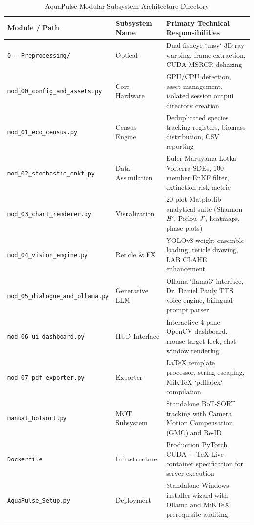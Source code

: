 \documentclass[11pt,a4paper]{article}
\begin{document}
\begin{table}[h!]
\caption{AquaPulse Modular Subsystem Architecture Directory}
\label{tab:codebase_structure}
\centering
\small
\begin{tabular}{p{4.8cm} p{2.8cm} p{8.2cm}}
\toprule
\textbf{Module / Path} & \textbf{Subsystem Name} & \textbf{Primary Technical Responsibilities} \\
\midrule
\texttt{0 - Preprocessing/} & Optical & Dual-fisheye `.insv` 3D ray warping, frame extraction, CUDA MSRCR dehazing \\
\texttt{mod\_00\_config\_and\_assets.py} & Core Hardware & GPU/CPU detection, asset management, isolated session output directory creation \\
\texttt{mod\_01\_eco\_census.py} & Census Engine & Deduplicated species tracking registers, biomass distribution, CSV reporting \\
\texttt{mod\_02\_stochastic\_enkf.py} & Data Assimilation & Euler-Maruyama Lotka-Volterra SDEs, 100-member EnKF filter, extinction risk metric \\
\texttt{mod\_03\_chart\_renderer.py} & Visualization & 20-plot Matplotlib analytical suite (Shannon $H'$, Pielou $J'$, heatmaps, phase plots) \\
\texttt{mod\_04\_vision\_engine.py} & Reticle \& FX & YOLOv8 weight ensemble loading, reticle drawing, LAB CLAHE enhancement \\
\texttt{mod\_05\_dialogue\_and\_ollama.py} & Generative LLM & Ollama `llama3` interface, Dr. Daniel Pauly TTS voice engine, bilingual prompt parser \\
\texttt{mod\_06\_ui\_dashboard.py} & HUD Interface & Interactive 4-pane OpenCV dashboard, mouse target lock, chat window rendering \\
\texttt{mod\_07\_pdf\_exporter.py} & Exporter & LaTeX template processor, string escaping, MiKTeX `pdflatex` compilation \\
\texttt{manual\_botsort.py} & MOT Subsystem & Standalone BoT-SORT tracking with Camera Motion Compensation (GMC) and Re-ID \\
\texttt{Dockerfile} & Infrastructure & Production PyTorch CUDA + TeX Live container specification for server execution \\
\texttt{AquaPulse\_Setup.py} & Deployment & Standalone Windows installer wizard with Ollama and MiKTeX prerequisite auditing \\
\bottomrule
\end{tabular}
\end{table}
\end{document}
